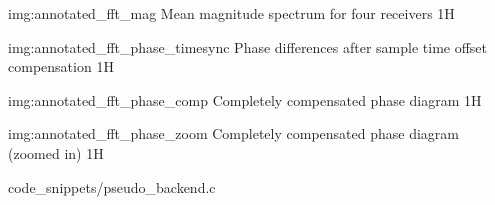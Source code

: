              {img:annotated_fft_mag}
             {Mean magnitude spectrum for four receivers}
             {1}{H}

             {img:annotated_fft_phase_timesync}
             {Phase differences after sample time offset compensation}
             {1}{H}

             {img:annotated_fft_phase_comp}
             {Completely compensated phase diagram}
             {1}{H}

             {img:annotated_fft_phase_zoom}
             {Completely compensated phase diagram (zoomed in)}
             {1}{H}


                {code_snippets/pseudo_backend.c}
